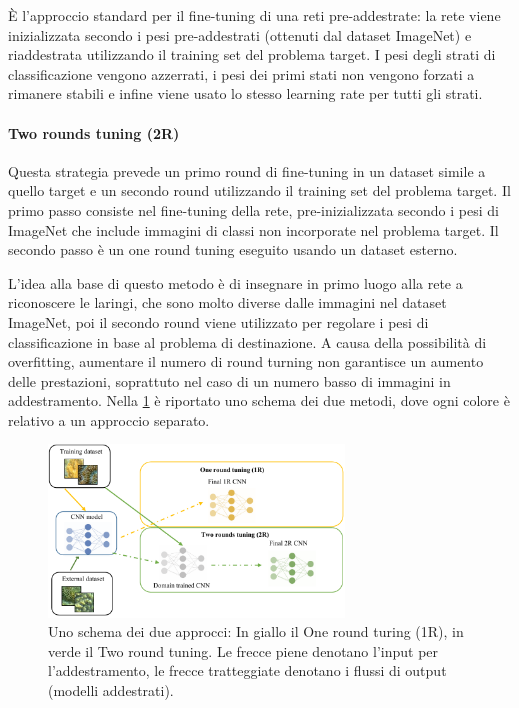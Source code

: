 È l'approccio standard per il fine-tuning di una reti pre-addestrate: la rete viene inizializzata secondo i pesi pre-addestrati (ottenuti dal dataset ImageNet) e riaddestrata utilizzando il training set del problema target. I pesi degli strati di classificazione vengono azzerrati, i pesi dei primi stati non vengono forzati a rimanere stabili e infine viene usato lo stesso learning rate per tutti gli strati\cite{lumini_plankton}. 

\paragraph{Two rounds tuning (2R)} \label{two-round-tuning}

Questa strategia prevede un primo round di fine-tuning in un dataset simile a quello target e un secondo round utilizzando il training set del problema target. Il primo passo consiste nel fine-tuning della rete, pre-inizializzata secondo i pesi di ImageNet che include immagini di classi non incorporate nel problema target. Il secondo passo è un one round tuning eseguito usando un  dataset esterno. 

L'idea alla base di questo metodo è di insegnare in primo luogo alla rete a riconoscere le laringi, che sono molto diverse dalle immagini nel dataset ImageNet, poi il secondo round viene utilizzato per regolare i pesi di classificazione in base al problema di destinazione. A causa della possibilità di \gls{overfitting}, aumentare il numero di round turning non garantisce un aumento delle prestazioni, soprattuto nel caso di un numero basso di immagini in addestramento\cite{lumini_plankton}. Nella \cref{fig:tl_2rt}  è riportato uno schema dei due metodi, dove ogni colore è relativo a un approccio separato. 

\begin{figure}[ht]
    \centering
    \includegraphics[width=0.7\textwidth]{transfer-learning/tl_2rt.pdf}
    \caption{Uno schema dei due approcci: In giallo il One round turing (1R), in verde il Two round tuning. Le frecce piene denotano l'input per l'addestramento, le frecce tratteggiate denotano i flussi di output (modelli addestrati).}
    \label{fig:tl_2rt}
\end{figure}

